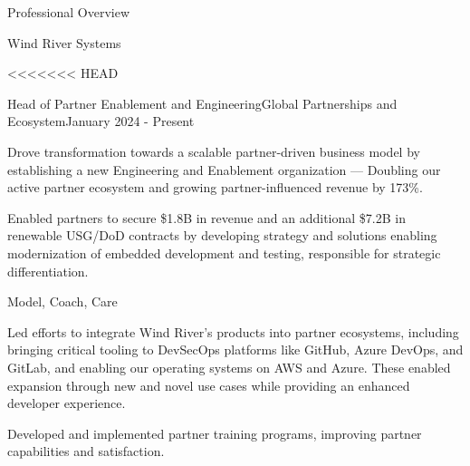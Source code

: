\documentclass{resume} %
\begin{document}
\begin{rSection}{Professional Overview}
  
  \begin{rCompany}{Wind River Systems}{}{}

<<<<<<< HEAD
    \begin{rSubSubsection}{Head of Partner Enablement and Engineering}{Global Partnerships and Ecosystem}{January 2024 - Present}
      \item Drove transformation towards a scalable partner-driven business model by establishing a new Engineering and Enablement organization --- Doubling our active partner ecosystem and growing partner-influenced revenue by 173\%.
      \item Enabled partners to secure \$1.8B in revenue and an additional \$7.2B in renewable USG/DoD contracts by developing strategy and solutions enabling modernization of embedded development and testing, responsible for strategic differentiation.
      \item Model, Coach, Care
      \item Led efforts to integrate Wind River's products into partner ecosystems, including bringing critical tooling to DevSecOps platforms like GitHub, Azure DevOps, and GitLab, and enabling our operating systems on AWS and Azure. These enabled expansion through new and novel use cases while providing an enhanced developer experience.
      \item Developed and implemented partner training programs, improving partner capabilities and satisfaction.
      

\end{rSubSubsection}
\end{rCompany}
\end{rSection}
\end{document}
